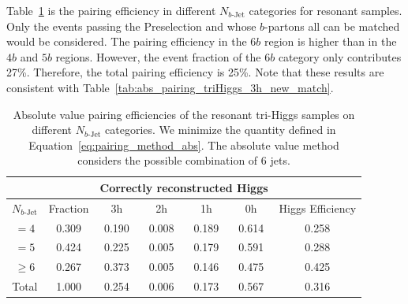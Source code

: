 \documentclass[12pt]{article}
\begin{document}
    Table~\ref{tab:resonant_abs_pairing_3h_nbj} is the pairing efficiency in different $N_{b\text{-Jet}}$ categories for resonant samples. Only the events passing the Preselection and whose $b$-partons all can be matched would be considered. The pairing efficiency in the $6b$ region is higher than in the $4b$ and $5b$ regions. However, the event fraction of the $6b$ category only contributes 27\%. Therefore, the total pairing efficiency is 25\%. Note that these results are consistent with Table~\ref{tab:abs_pairing_triHiggs_3h_new_match}.
    \begin{table}[htpb]
		\centering
		\caption{Absolute value pairing efficiencies of the resonant tri-Higgs samples on different $N_{b\text{-Jet}}$ categories. We minimize the quantity defined in Equation~\ref{eq:pairing_method_abs}. The absolute value method considers the possible combination of 6 jets.}
		\label{tab:resonant_abs_pairing_3h_nbj}
        \begin{tabular}{c|c|cccc|c}
        \multicolumn{1}{l|}{} &          & \multicolumn{4}{c|}{Correctly reconstructed Higgs} & \multicolumn{1}{l}{} \\ \hline
        $N_{b\text{-Jet}}$    & Fraction & 3h          & 2h         & 1h         & 0h         & Higgs Efficiency     \\ \hline
        $=4$                  & 0.309 & 0.190 & 0.008 & 0.189 & 0.614 & 0.258 \\
        $=5$                  & 0.424 & 0.225 & 0.005 & 0.179 & 0.591 & 0.288 \\
        $\ge 6$               & 0.267 & 0.373 & 0.005 & 0.146 & 0.475 & 0.425 \\ \hline
        Total                 & 1.000 & 0.254 & 0.006 & 0.173 & 0.567 & 0.316 
		\end{tabular}
	\end{table}
\end{document}
